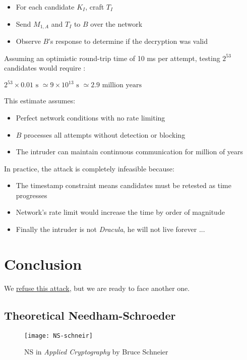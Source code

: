 \documentclass[11pt]{article}
\begin{document}
    \begin{itemize}
        \item For each candidate $K_I$, craft $T_I$
        \item Send $M_{1,A}$ and $T_I$ to $B$ over the network
        \item Observe $B$'s response to determine if the decryption was valid 
    \end{itemize}
    
    Assuming an optimistic round-trip time of 10 ms per attempt, testing $2^{53}$ candidates would require : 
    \begin{center}
        $2^{53} \times 0.01 \text{ s } \simeq 9 \times 10^{13} \text{ s } \simeq 2.9 \text{ million years} $
    \end{center}


    This estimate assumes:
    \begin{itemize}
        \item Perfect network conditions with no rate limiting
        \item $B$ processes all attempts without detection or blocking
        \item The intruder can maintain continuous communication for million of years
    \end{itemize}

    In practice, the attack is completely infeasible because:
    \begin{itemize}
        \item The timestamp constraint means candidates must be retested as time progresses
        \item Network's rate limit would increase the time by order of magnitude
        \item Finally the intruder is not \textit{Dracula}, he will not live forever ...
    \end{itemize}


    




    
    \section{Conclusion}
    We \underline{refuse this attack}, but we are ready to face another one.


    \newpage
    \begin{appendices}

        \section{Theoretical Needham-Schroeder}\label{ann:NS_BS}


        \begin{figure}[h!]
            \centering
            \texttt{[image: NS-schneir]}
            \caption{NS in \textit{Applied Cryptography} by Bruce Schneier}
            \label{fig:NS_BS}
        \end{figure}

    \end{appendices}
\end{document}
